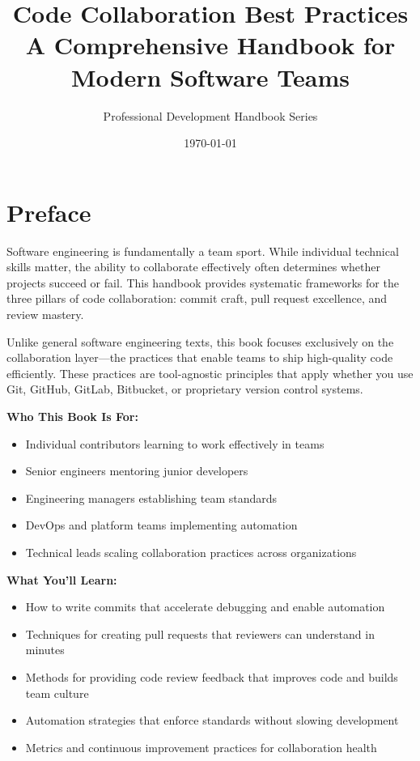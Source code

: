 \documentclass[11pt,openany]{book}
\title{
  {\Huge\textbf{Code Collaboration Best Practices}}\\[1em]
  {\Large A Comprehensive Handbook for Modern Software Teams}
}
\author{Professional Development Handbook Series}
\date{\today}
\begin{document}
\frontmatter
\maketitle

\tableofcontents
\listoffigures
\listoftables

\chapter*{Preface}

Software engineering is fundamentally a team sport. While individual technical skills matter, the ability to collaborate effectively often determines whether projects succeed or fail. This handbook provides systematic frameworks for the three pillars of code collaboration: commit craft, pull request excellence, and review mastery.

Unlike general software engineering texts, this book focuses exclusively on the collaboration layer---the practices that enable teams to ship high-quality code efficiently. These practices are tool-agnostic principles that apply whether you use Git, GitHub, GitLab, Bitbucket, or proprietary version control systems.

\textbf{Who This Book Is For:}

\begin{itemize}
  \item Individual contributors learning to work effectively in teams
  \item Senior engineers mentoring junior developers
  \item Engineering managers establishing team standards
  \item DevOps and platform teams implementing automation
  \item Technical leads scaling collaboration practices across organizations
\end{itemize}

\textbf{What You'll Learn:}

\begin{itemize}
  \item How to write commits that accelerate debugging and enable automation
  \item Techniques for creating pull requests that reviewers can understand in minutes
  \item Methods for providing code review feedback that improves code and builds team culture
  \item Automation strategies that enforce standards without slowing development
  \item Metrics and continuous improvement practices for collaboration health
\end{itemize}
\end{document}
